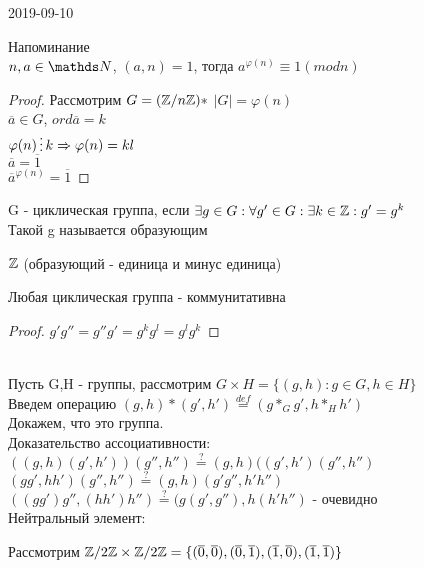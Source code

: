 \documentclass[main, 12pt, fleqn]{subfiles}
\begin{document}
\begin{lect} {2019-09-10}
		
\begin{consequence}
	Напоминание\\
    $n,a \in \N$, $(a,n)=1$, тогда $a^{\varphi(n)} \equiv 1 (mod n)$
\end{consequence}

\begin{proof}
    Рассмотрим $G=(\mathbb{Z} / n \mathbb{Z})*$ $|G|=\varphi(n)$\\
    $\overline{a} \in G$, $ord \overline{a}=k$\\
    $\varphi(n) \devides k \Ra \varphi(n) = kl$\\
    $\overline{a}=\overline{1}$\\
    $\overline{a}^{\varphi(n)}=\overline{1}$
\end{proof}

\begin{definition}
    G - циклическая группа, если $\exists g \in G: \forall g' \in G: \exists k \in \mathbb{Z}: g'=g^k$\\
    Такой g называется образующим
\end{definition}

\begin{definition}
    $\mathbb{Z}$ (образующий - единица и минус единица)
\end{definition}

\begin{remark}
    Любая циклическая группа - коммунитативна
\end{remark}

\begin{proof}
    $g' g'' = g'' g' = g^k g^l = g^l g^k$
\end{proof}
\\
Пусть G,H - группы, рассмотрим $G \times H = \{(g,h): g\in G, h\in H\}$\\
Введем операцию $(g,h)*(g',h')\overset{def}{=}(g*_G g', h*_H h')$\\
Докажем, что это группа.\\
Доказательство ассоциативности:
$((g,h)(g',h'))(g'',h'') \overset{?}{=} (g,h)((g',h')(g'',h'')$\\
$(gg',hh')(g'',h'') \overset{?}{=} (g,h)(g' g'', h' h'')$\\
$((gg')g'',(hh')h'') \overset{?}{=} (g(g',g''),h(h'h'')$ - очевидно\\
Нейтральный элемент:

Рассмотрим $\mathbb{Z} /2 \mathbb{Z} \times \mathbb{Z} /2 \mathbb{Z} = \{(\overline{0},\overline{0}),(\overline{0},\overline{1}),(\overline{1},\overline{0}),(\overline{1},\overline{1})\}$


\end{lect}
\end{document}
